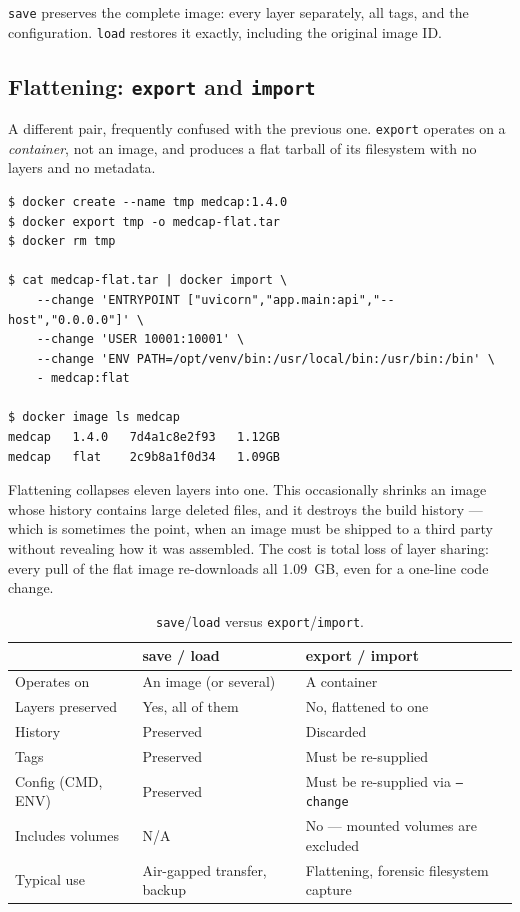 \documentclass[10pt,a4paper]{article}
\newcommand{\cmd}[1]{\texttt{\small #1}}
\begin{document}
\cmd{save} preserves the complete image: every layer separately, all
tags, and the configuration. \cmd{load} restores it exactly, including
the original image ID.

\subsection{Flattening: \cmd{export} and \cmd{import}}

A different pair, frequently confused with the previous one.
\cmd{export} operates on a \emph{container}, not an image, and produces
a flat tarball of its filesystem with no layers and no metadata.

\begin{lstlisting}[style=shell]
$ docker create --name tmp medcap:1.4.0
$ docker export tmp -o medcap-flat.tar
$ docker rm tmp

$ cat medcap-flat.tar | docker import \
    --change 'ENTRYPOINT ["uvicorn","app.main:api","--host","0.0.0.0"]' \
    --change 'USER 10001:10001' \
    --change 'ENV PATH=/opt/venv/bin:/usr/local/bin:/usr/bin:/bin' \
    - medcap:flat

$ docker image ls medcap
medcap   1.4.0   7d4a1c8e2f93   1.12GB
medcap   flat    2c9b8a1f0d34   1.09GB
\end{lstlisting}

Flattening collapses eleven layers into one. This occasionally shrinks
an image whose history contains large deleted files, and it destroys the
build history --- which is sometimes the point, when an image must be
shipped to a third party without revealing how it was assembled. The
cost is total loss of layer sharing: every pull of the flat image
re-downloads all 1.09~GB, even for a one-line code change.

\begin{table}[htbp]
\centering
\caption{\cmd{save}/\cmd{load} versus \cmd{export}/\cmd{import}.}
\label{tab:saveexport}
\footnotesize
\begin{tabularx}{\linewidth}{@{}l X X@{}}
\toprule
 & \textbf{save / load} & \textbf{export / import} \\
\midrule
Operates on      & An image (or several)     & A container \\
Layers preserved & Yes, all of them          & No, flattened to one \\
History          & Preserved                 & Discarded \\
Tags             & Preserved                 & Must be re-supplied \\
Config (CMD, ENV)& Preserved                 & Must be re-supplied via \cmd{--change} \\
Includes volumes & N/A                       & No --- mounted volumes are excluded \\
Typical use      & Air-gapped transfer, backup & Flattening, forensic filesystem capture \\
\bottomrule
\end{tabularx}
\end{table}
\end{document}

